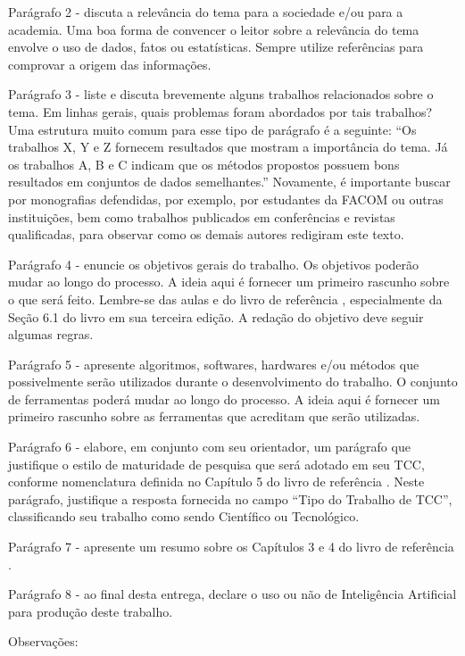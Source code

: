\documentclass[
	12pt,				%
	openright,			%
	oneside,			%
	a4paper,			%
	chapter=TITLE,		%
	subsection=TITLE,	%
	english,			%
	brazil,				%
	]{abntex2}
\begin{document}
Parágrafo 2 - discuta a relevância do tema para a sociedade e/ou para a academia. Uma boa forma de convencer o leitor sobre a relevância do tema envolve o uso de dados, fatos ou estatísticas. Sempre utilize referências para comprovar a origem das informações.

Parágrafo 3 - liste e discuta brevemente alguns trabalhos relacionados sobre o tema. Em linhas gerais, quais problemas foram abordados por tais trabalhos? Uma estrutura muito comum para esse tipo de parágrafo é a seguinte: ``Os trabalhos X, Y e Z fornecem resultados que mostram a importância do tema. Já os trabalhos A, B e C indicam que os métodos propostos possuem bons resultados em conjuntos de dados semelhantes.'' Novamente, é importante buscar por monografias defendidas, por exemplo, por estudantes da FACOM ou outras instituições, bem como trabalhos publicados em conferências e revistas qualificadas, para observar como os demais autores redigiram este texto.

Parágrafo 4 - enuncie os objetivos gerais do trabalho. Os objetivos poderão mudar ao longo do processo. A ideia aqui é fornecer um primeiro rascunho sobre o que será feito. Lembre-se das aulas e do livro de referência \cite{metodologiaWazlawick}, especialmente da Seção 6.1 do livro em sua terceira edição. A redação do objetivo deve seguir algumas regras.

Parágrafo 5 - apresente algoritmos, softwares, hardwares e/ou métodos que possivelmente serão utilizados durante o desenvolvimento do trabalho. O conjunto de ferramentas poderá mudar ao longo do processo. A ideia aqui é fornecer um primeiro rascunho sobre as ferramentas que acreditam que serão utilizadas.

Parágrafo 6 - elabore, em conjunto com seu orientador, um parágrafo que justifique o estilo de maturidade de pesquisa que será adotado em seu TCC, conforme nomenclatura definida no Capítulo 5 do livro de referência \cite{metodologiaWazlawick}. Neste parágrafo, justifique a resposta fornecida no campo ``Tipo do Trabalho de TCC'', classificando seu trabalho como sendo Científico ou Tecnológico.

Parágrafo 7 - apresente um resumo sobre os Capítulos 3 e 4 do livro de referência \cite{metodologiaWazlawick}.

Parágrafo 8 - ao final desta entrega, declare o uso ou não de Inteligência Artificial para produção deste trabalho.

Observações:
\end{document}
